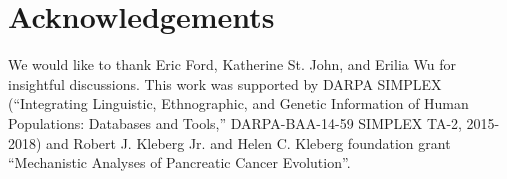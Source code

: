 \documentclass[11pt]{article}
\begin{document}
\section{Acknowledgements}
We would like to thank Eric Ford, Katherine St. John, and Erilia Wu for insightful discussions. This work was supported by DARPA SIMPLEX (``Integrating Linguistic, Ethnographic, and Genetic Information of Human Populations: Databases and Tools,'' DARPA-BAA-14-59 SIMPLEX TA-2, 2015-2018)
 and Robert J. Kleberg Jr. and Helen C. Kleberg foundation grant ``Mechanistic Analyses of Pancreatic Cancer Evolution''.

\newpage

\end{document}
